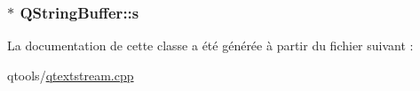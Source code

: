 \subsubsection[{s}]{$\ast$ Q\+String\+Buffer\+::s\hspace{0.3cm}{\ttfamily [protected]}}\label{class_q_string_buffer_a04a03f7ce67b5cf129bb46b816b57450}


La documentation de cette classe a été générée à partir du fichier suivant \+:\begin{DoxyCompactItemize}
\item 
qtools/\hyperlink{qtextstream_8cpp}{qtextstream.\+cpp}\end{DoxyCompactItemize}
